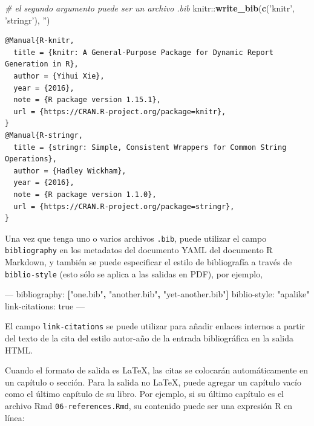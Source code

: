 \documentclass[12pt,]{krantz}
\makeatletter
\newenvironment{Shaded}{\begin{snugshade}}{\end{snugshade}}
\newcommand{\KeywordTok}[1]{\textcolor[rgb]{0.13,0.29,0.53}{\textbf{{#1}}}}
\newcommand{\StringTok}[1]{\textcolor[rgb]{0.31,0.60,0.02}{{#1}}}
\newcommand{\CommentTok}[1]{\textcolor[rgb]{0.56,0.35,0.01}{\textit{{#1}}}}
\newcommand{\OtherTok}[1]{\textcolor[rgb]{0.56,0.35,0.01}{{#1}}}
\newcommand{\FunctionTok}[1]{\textcolor[rgb]{0.00,0.00,0.00}{{#1}}}
\newcommand{\NormalTok}[1]{{#1}}
\newenvironment{kframe}{%
\medskip{}
\setlength{\fboxsep}{.8em}
 \def\at@end@of@kframe{}%
 \ifinner\ifhmode%
  \def\at@end@of@kframe{\end{minipage}}%
  \begin{minipage}{\columnwidth}%
 \fi\fi%
 \def\FrameCommand##1{\hskip\@totalleftmargin \hskip-\fboxsep
 \colorbox{shadecolor}{##1}\hskip-\fboxsep
     \hskip-\linewidth \hskip-\@totalleftmargin \hskip\columnwidth}%
 \MakeFramed {\advance\hsize-\width
   \@totalleftmargin\z@ \linewidth\hsize
   \@setminipage}}%
 {\par\unskip\endMakeFramed%
 \at@end@of@kframe}
\renewenvironment{Shaded}{\begin{kframe}}{\end{kframe}}
\theoremstyle{definition}
\theoremstyle{definition}
\theoremstyle{remark}
\makeatother
\begin{document}
\begin{Shaded}
\begin{Highlighting}[]
\CommentTok{# el segundo argumento puede ser un archivo .bib}
\NormalTok{knitr::}\KeywordTok{write_bib}\NormalTok{(}\KeywordTok{c}\NormalTok{(}\StringTok{'knitr'}\NormalTok{, }\StringTok{'stringr'}\NormalTok{), }\StringTok{''}\NormalTok{)}
\end{Highlighting}
\end{Shaded}

\begin{verbatim}
@Manual{R-knitr,
  title = {knitr: A General-Purpose Package for Dynamic Report Generation in R},
  author = {Yihui Xie},
  year = {2016},
  note = {R package version 1.15.1},
  url = {https://CRAN.R-project.org/package=knitr},
}
@Manual{R-stringr,
  title = {stringr: Simple, Consistent Wrappers for Common String Operations},
  author = {Hadley Wickham},
  year = {2016},
  note = {R package version 1.1.0},
  url = {https://CRAN.R-project.org/package=stringr},
}
\end{verbatim}

Una vez que tenga uno o varios archivos \texttt{.bib}, puede utilizar el
campo \texttt{bibliography} en los metadatos del documento YAML del
documento R Markdown, y también se puede especificar el estilo de
bibliografía a través de \texttt{biblio-style} (esto sólo se aplica a
las salidas en PDF), por ejemplo,

\begin{Shaded}
\begin{Highlighting}[]
\OtherTok{---}
\FunctionTok{bibliography:} \KeywordTok{[}\StringTok{"one.bib"}\KeywordTok{,} \StringTok{"another.bib"}\KeywordTok{,} \StringTok{"yet-another.bib"}\KeywordTok{]}
\FunctionTok{biblio-style:} \StringTok{"apalike"}
\FunctionTok{link-citations:} \NormalTok{true}
\OtherTok{---}
\end{Highlighting}
\end{Shaded}

El campo \texttt{link-citations} se puede utilizar para añadir enlaces
internos a partir del texto de la cita del estilo autor-año de la
entrada bibliográfica en la salida HTML.

Cuando el formato de salida es LaTeX, las citas se colocarán
automáticamente en un capítulo o sección. Para la salida no LaTeX, puede
agregar un capítulo vacío como el último capítulo de su libro. Por
ejemplo, si su último capítulo es el archivo Rmd
\texttt{06-references.Rmd}, su contenido puede ser una expresión R en
línea:
\end{document}
